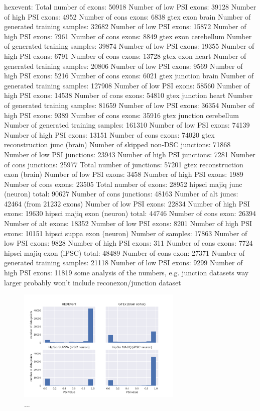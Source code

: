 hexevent:
Total number of exons: 50918
Number of low PSI exons: 39128
Number of high PSI exons: 4952
Number of cons exons: 6838
gtex exon brain
Number of generated training samples: 32682
Number of low PSI exons: 15872
Number of high PSI exons: 7961
Number of cons exons: 8849
gtex exon cerebellum
Number of generated training samples: 39874
Number of low PSI exons: 19355
Number of high PSI exons: 6791
Number of cons exons: 13728
gtex exon heart
Number of generated training samples: 20806
Number of low PSI exons: 9569
Number of high PSI exons: 5216
Number of cons exons: 6021
gtex junction brain
Number of generated training samples: 127908
Number of low PSI exons: 58560
Number of high PSI exons: 14538
Number of cons exons: 54810
gtex junction heart
Number of generated training samples: 81659
Number of low PSI exons: 36354
Number of high PSI exons: 9389
Number of cons exons: 35916
gtex junction cerebellum
Number of generated training samples: 161310
Number of low PSI exons: 74139
Number of high PSI exons: 13151
Number of cons exons: 74020
gtex reconstruction junc (brain)
Number of skipped non-DSC junctions: 71868
Number of low PSI junctions: 23943
Number of high PSI junctions: 7281
Number of cons junctions: 25977
Total number of junctions: 57201
gtex reconstruction exon (brain)
Number of low PSI exons: 3458
Number of high PSI exons: 1989
Number of cons exons: 23505
Total number of exons: 28952
hipsci majiq junc (neuron)
total: 90627
Number of cons junctions: 48163
Number of alt juncs: 42464 (from 21232 exons)
Number of low PSI exons: 22834
Number of high PSI exons: 19630
hipsci majiq exon (neuron)
total: 44746
Number of cons exon: 26394
Number of alt exons: 18352
Number of low PSI exons: 8201
Number of high PSI exons: 10151
hipsci suppa exon (neuron)
Number of samples: 17863
Number of low PSI exons: 9828
Number of high PSI exons: 311
Number of cons exons: 7724
hipsci majiq exon (iPSC)
total: 48489
Number of cons exon: 27371
Number of generated training samples: 21118
Number of low PSI exons: 9299
Number of high PSI exons: 11819
some analysis of the numbers, e.g. junction datasets way larger
probably won't include reconexon/junction dataset

\begin{figure}
	\centering\includegraphics[width=0.7\textwidth]{../visualizations/dataset_histograms_seaborn.png} 
	\caption[test.]{
		...
	}
	\label{fig:datahistograms}
\end{figure}

